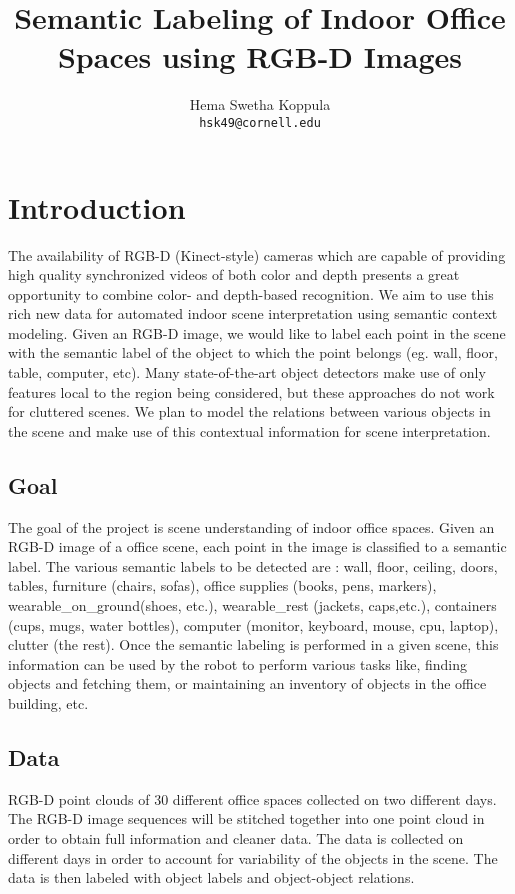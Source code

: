 \documentclass[11pt]{article} %
\title{Semantic Labeling of Indoor Office Spaces using RGB-D Images }
\author{
Hema Swetha Koppula \\
 \texttt{hsk49@cornell.edu}
}
\begin{document}
\maketitle

%

\section{Introduction}


  
  The availability of  RGB-D (Kinect-style) cameras \cite{kinect} which are capable of providing high quality synchronized 
  videos of both color and depth presents a great opportunity to combine color- and depth-based recognition. We aim 
  to use this rich new data for automated indoor scene interpretation using semantic context modeling. Given an RGB-D 
  image, we would like to label each point in the scene with the semantic label of the object to which the point belongs
  (eg. wall, floor, table, computer, etc). Many state-of-the-art object detectors make use of only features local to the region being 
  considered, but these approaches do not work for cluttered scenes. We plan to model the relations between various objects 
  in the scene and make use of this contextual information for scene interpretation. 

   \subsection{Goal}
     The goal of the project is scene understanding of indoor office spaces. Given an RGB-D image of a office scene, each point in the 
     image is classified to a semantic label. The various semantic labels to be detected are : wall, floor, ceiling, doors, tables, furniture 
     (chairs, sofas), office supplies (books, pens, markers), wearable\_on\_ground(shoes, etc.), wearable\_rest (jackets, caps,etc.), 
     containers (cups, mugs, water bottles), computer (monitor, keyboard, mouse, cpu, laptop), clutter (the rest). Once the semantic labeling 
     is performed in a given scene, this information can be used by the robot to perform various tasks like, finding objects and fetching them, 
     or maintaining an inventory of objects in the office building, etc.

   \subsection{Data}
     RGB-D point clouds of 30 different office spaces collected on two different days. The RGB-D image sequences will be stitched together
     into one point cloud in order to obtain full information and cleaner data. The data is collected on different days in order to account for 
     variability of the objects in the scene. The data is then labeled with object labels and object-object relations.
     
\end{document}
